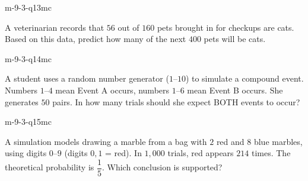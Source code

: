 \begin{practiceQuestion}{m-9-3-q13}{mc}
\begin{questionText}
A veterinarian records that $56$ out of $160$ pets brought in for checkups are cats. Based on this data, predict how many of the next $400$ pets will be cats.
\end{questionText}
\end{practiceQuestion}

\begin{practiceQuestion}{m-9-3-q14}{mc}
\begin{questionText}
A student uses a random number generator ($1$--$10$) to simulate a compound event. Numbers $1$--$4$ mean Event A occurs, numbers $1$--$6$ mean Event B occurs. She generates $50$ pairs. In how many trials should she expect BOTH events to occur?
\end{questionText}
\end{practiceQuestion}

\begin{practiceQuestion}{m-9-3-q15}{mc}
\begin{questionText}
A simulation models drawing a marble from a bag with $2$ red and $8$ blue marbles, using digits $0$--$9$ (digits $0, 1$ = red). In $1{,}000$ trials, red appears $214$ times. The theoretical probability is $\dfrac{1}{5}$. Which conclusion is supported?
\end{questionText}
\end{practiceQuestion}

